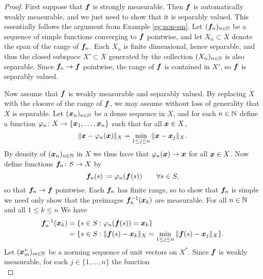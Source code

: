 \begin{proof}
  First suppose that $\bm{f}$ is strongly measurable.
  Then $\bm{f}$ is automatically weakly measurable, and we just need to show that it is separably valued.
  This essentially follows the argument from Example \ref{eg:non-sm}.
  Let $(\bm{f}_n)_{n \in \mathbb{N}}$ be a sequence of simple functions converging to $\bm{f}$ pointwise, and let $X_n \subset X$ denote the span of the range of $\bm{f}_n$.
  Each $X_n$ is finite dimensional, hence separable, and thus the closed subspace $X' \subset X$ generated by the collection $(X_n)_{n \in \mathbb{N}}$ is also separable.
  Since $\bm{f}_n \to \bm{f}$ pointwise, the range of $\bm{f}$ is contained in $X'$, so $\bm{f}$ is separably valued.

  Now assume that $\bm{f}$ is weakly measurable and separably valued.
  By replacing $X$ with the closure of the range of $\bm{f}$, we may assume without loss of generality that $X$ is separable.
  Let $(\bm{x}_n)_{n \in \mathbb{N}}$ be a dense sequence in $X$, and for each $n \in \mathbb{N}$ define a function $\varphi_n \colon X \rightarrow \{\bm{x}_1,\ldots,\bm{x}_n\}$ such that for all $\bm{x} \in X$,
  \begin{equation*}
    \|\bm{x} - \varphi_n(\bm{x})\|_X = \min_{1 \leq j \leq n} \|\bm{x} - \bm{x}_j\|_X.
  \end{equation*}
  By density of $(\bm{x}_n)_{n \in \mathbb{N}}$ in $X$ we thus have that $\varphi_n(\bm{x}) \to \bm{x}$ for all $\bm{x} \in X$.
  Now define functions $\bm{f}_n \colon S \rightarrow X$ by
  \begin{equation*}
    \bm{f}_n(s) := \varphi_n(\bm{f}(s)) \qquad \forall s \in S,
  \end{equation*}
  so that $\bm{f}_n \to \bm{f}$ pointwise.
  Each $\bm{f}_n$ has finite range, so to show that $\bm{f}_n$ is simple we need only show that the preimages $\bm{f}_n^{-1}(\bm{x}_k)$ are measurable.
  For all $n \in \mathbb{N}$ and all $1 \leq k \leq n$ We have
  \begin{equation*}
    \begin{aligned}
    \bm{f}_n^{-1}(\bm{x}_k)
    &= \{s \in S : \varphi_n(\bm{f}(s)) = \bm{x}_k \} \\
    &= \{s \in S : \|\bm{f}(s) - \bm{x}_k\|_X = \min_{1 \leq j \leq n} \|\bm{f}(s) - \bm{x}_j\|_X \}.
  \end{aligned}
  \end{equation*}
  Let $(\bm{x}_m^*)_{m \in \mathbb{N}}$ be a norming sequence of unit vectors on $X^*$.
  Since $\bm{f}$ is weakly measurable, for each $j \in \{1,\ldots,n\}$ the function
  \begin{equation*}

\end{equation*}
\end{proof}
